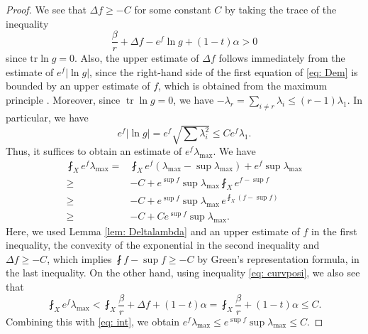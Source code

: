 \documentclass[a4, 12pt, 
]{amsart}
\numberwithin{equation}{section}
\theoremstyle{plain}
\theoremstyle{definition}
\theoremstyle{remark}
\begin{document}
\begin{proof}
    We see that $\Delta f\ge -C$ for some constant $C$ by taking the trace of the inequality
    \begin{equation}\label{eq: curvposi}
        \frac{\beta}{r}+\Delta f-e^f\ln g+(1-t)\alpha>0
    \end{equation} 
    since $\mathrm{tr}\ln g=0$.
    Also, the upper estimate of $\Delta f$ follows immediately from the estimate of $e^f |\ln g|$, since the right-hand side of the first equation of \eqref{eq: Dem} is bounded by an upper estimate of $f$, which is obtained from the maximum principle \cite[Remark 2.1]{Pin23}.
    Moreover, since $\operatorname{tr} \ln g=0$, we have $-\lambda_r=\sum_{i\neq r}\lambda_i\le (r-1)\lambda_1$. In particular, we have
    $$e^f |\ln g|=e^f \sqrt{\sum\lambda_i^2}\le C e^f\lambda_1.$$
    Thus, it suffices to obtain an estimate of $e^f\lambda_{\mathrm{max}}$. 
    We have
    \begin{equation}\label{eq: int}
        \begin{aligned}
            \fint_X e^f\lambda_{\mathrm{max}}
            =&\fint_X e^f (\lambda_{\mathrm{max}}-\sup \lambda_{\mathrm{max}})+e^f\sup \lambda_{\mathrm{max}}\\
            \ge& -C+ e^{\sup f}\sup \lambda_{\mathrm{max}}\fint_Xe^{f-\sup f}\\
            \ge& -C+ e^{\sup f}\sup \lambda_{\mathrm{max}}\, e^{\fint_X (f-\sup f)} \\
            \ge& -C+C e^{\sup f} \sup \lambda_{\mathrm{max}}.
        \end{aligned}
    \end{equation}
    Here, we used Lemma \ref{lem: Deltalambda} and an upper estimate of $f$ \cite[Remark 2.1]{Pin23} in the first inequality, the convexity of the exponential in the second inequality and $\Delta f\ge -C$, which implies $\fint f-\sup f\ge -C$ by Green's representation formula, in the last inequality.  On the other hand, using inequality \eqref{eq: curvposi}, we also see that
    \begin{equation}\label{eq: L^1}
        \fint_X e^f \lambda_{\mathrm{max}}< \fint_X \frac{\beta}{r}+\Delta f+(1-t)\alpha=\fint_X \frac{\beta}{r}+(1-t)\alpha\le C.
    \end{equation}
    Combining this with \eqref{eq: int}, we obtain $e^f\lambda_{\mathrm{max}}\le e^{\sup f}\sup \lambda_{\mathrm{max}}\le C$.
    \end{proof}
\end{document}
